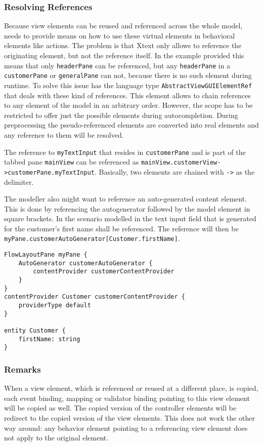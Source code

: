 \subsubsection{Resolving References}
Because view elements can be reused and referenced across the whole model, \MD needs to provide means on how to use these virtual elements in behavioral elements like actions. The problem is that Xtext only allows to reference the originating element, but not the reference itself. In the example provided this means that only \lstinline!headerPane! can be referenced, but any \lstinline!headerPane! in a \lstinline!customerPane! or \lstinline!generalPane! can not, because there is no such element during runtime. To solve this issue \MD has the language type \lstinline!AbstractViewGUIElementRef! that deals with these kind of references. This element allows to chain references to any element of the model in an arbitrary order. However, the scope has to be restricted to offer just the possible elements during autocompletion. During preprocessing the pseudo-referenced elements are converted into real elements and any reference to them will be resolved.

The reference to \lstinline!myTextInput! that resides in \lstinline!customerPane! and is part of the tabbed pane \lstinline!mainView! can be referenced as \lstinline!mainView.customerView->customerPane.myTextInput!. Basically, two elements are chained with \lstinline!->! as the delimiter.

The modeller also might want to reference an auto-generated content element. This is done by referencing the autogenerator followed by the model element in square brackets. In the scenario modelled in  the text input field that is generated for the customer’s first name shall be referenced. 
The reference will then be \lstinline!myPane.customerAutoGenerator[Customer.firstName]!.

\begin{lstlisting}[language=MD2, caption=Model using automatically generated view elements, label=lst:reference-autogenerator]
FlowLayoutPane myPane {
	AutoGenerator customerAutoGenerator {
		contentProvider customerContentProvider
	}
}
contentProvider Customer customerContentProvider {
	providerType default
}

entity Customer {
	firstName: string
}
\end{lstlisting}

\subsubsection{Remarks}
When a view element, which is referenced or reused at a different place, is copied, each event binding, mapping or validator binding pointing to this view element will be copied as well. The copied version of the controller elements will be redirect to the copied version of the view elements. This does not work the other way around: any behavior element pointing to a referencing view element does not apply to the original element.

